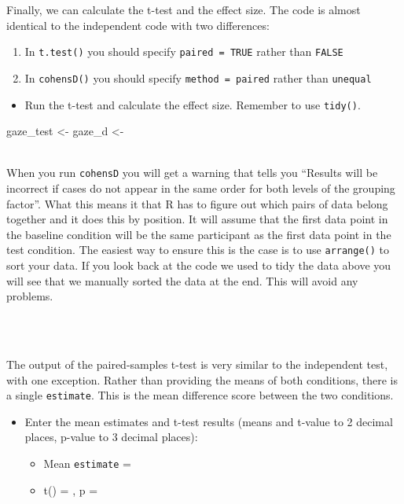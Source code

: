 \documentclass[]{book}
\newenvironment{Shaded}{\begin{snugshade}}{\end{snugshade}}
\newcommand{\NormalTok}[1]{#1}
\newcommand{\StringTok}[1]{\textcolor[rgb]{0.31,0.60,0.02}{#1}}
\providecommand{\tightlist}{%
  \setlength{\itemsep}{0pt}\setlength{\parskip}{0pt}}
\newenvironment{warning}
    {
    \hline\\
    }
    { 
    \\\\\hline
    }
\begin{document}
Finally, we can calculate the t-test and the effect size. The code is almost identical to the independent code with two differences:

\begin{enumerate}
\def\labelenumi{\arabic{enumi}.}
\tightlist
\item
  In \texttt{t.test()} you should specify \texttt{paired\ =\ TRUE} rather than \texttt{FALSE}
\item
  In \texttt{cohensD()} you should specify \texttt{method\ =\ paired} rather than \texttt{unequal}
\end{enumerate}

\begin{itemize}
\tightlist
\item
  Run the t-test and calculate the effect size. Remember to use \texttt{tidy()}.
\end{itemize}

\begin{Shaded}
\begin{Highlighting}[]
\NormalTok{gaze_test <-}\StringTok{ }
\NormalTok{gaze_d <-}\StringTok{ }
\end{Highlighting}
\end{Shaded}

\begin{warning}
When you run \texttt{cohensD} you will get a warning that tells you
``Results will be incorrect if cases do not appear in the same order for
both levels of the grouping factor''. What this means it that R has to
figure out which pairs of data belong together and it does this by
position. It will assume that the first data point in the baseline
condition will be the same participant as the first data point in the
test condition. The easiest way to ensure this is the case is to use
\texttt{arrange()} to sort your data. If you look back at the code we
used to tidy the data above you will see that we manually sorted the
data at the end. This will avoid any problems.
\end{warning}

The output of the paired-samples t-test is very similar to the independent test, with one exception. Rather than providing the means of both conditions, there is a single \texttt{estimate}. This is the mean difference score between the two conditions.

\begin{itemize}
\item
  Enter the mean estimates and t-test results (means and t-value to 2 decimal places, p-value to 3 decimal places):

  \begin{itemize}
  \item
    Mean \texttt{estimate} = 
  \item
    t() = , p = 
  \end{itemize}
\end{itemize}
\end{document}
